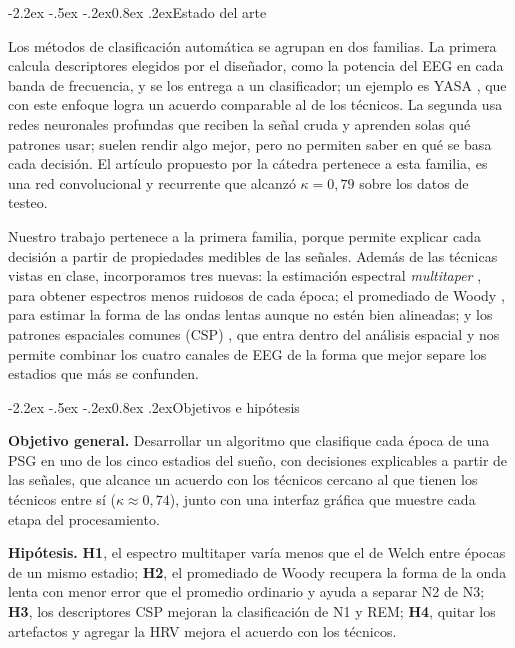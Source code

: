 \documentclass[11pt,a4paper]{article}
\makeatletter
\renewcommand\subsection{\@startsection{subsection}{2}{\z@}%
  {-2.2ex \@plus -.5ex \@minus -.2ex}{0.8ex \@plus .2ex}{\normalfont\normalsize\bfseries}}
\makeatother
\begin{document}
\subsection{Estado del arte}

Los métodos de clasificación automática se agrupan en dos familias. La
primera calcula descriptores elegidos por el diseñador, como la potencia
del EEG en cada banda de frecuencia, y se los entrega a un
clasificador; un ejemplo es YASA \cite{yasa}, que con este enfoque logra
un acuerdo comparable al de los técnicos. La segunda usa redes
neuronales profundas que reciben la señal cruda y aprenden solas qué
patrones usar; suelen rendir algo mejor, pero no permiten saber en qué
se basa cada decisión. El artículo propuesto por la cátedra
\cite{alvarez} pertenece a esta familia, es una red convolucional y
recurrente que alcanzó $\kappa = 0{,}79$ sobre los datos de testeo.

Nuestro trabajo pertenece a la primera familia, porque permite explicar
cada decisión a partir de propiedades medibles de las señales. Además de
las técnicas vistas en clase, incorporamos tres nuevas: la estimación espectral
\emph{multitaper} \cite{thomson,prerau}, para obtener espectros menos
ruidosos de cada época; el promediado de Woody \cite{woody}, para
estimar la forma de las ondas lentas aunque no estén bien alineadas; y
los patrones espaciales comunes (CSP) \cite{ramoser}, que entra dentro del análisis
espacial y nos permite combinar los cuatro canales de EEG de la forma que mejor separe los estadios que más
se confunden.

\subsection{Objetivos e hipótesis}

\textbf{Objetivo general.} Desarrollar un algoritmo que clasifique cada
época de una PSG en uno de los cinco estadios del sueño, con decisiones
explicables a partir de las señales, que alcance un acuerdo con
los técnicos cercano al que tienen los técnicos entre sí
($\kappa \approx 0{,}74$), junto con una interfaz gráfica que muestre
cada etapa del procesamiento.

\textbf{Hipótesis.} \textbf{H1}, el espectro multitaper varía menos que el de
Welch entre épocas de un mismo estadio; \textbf{H2}, el promediado de
Woody recupera la forma de la onda lenta con menor error que el promedio
ordinario y ayuda a separar N2 de N3; \textbf{H3}, los descriptores CSP
mejoran la clasificación de N1 y REM; \textbf{H4}, quitar los artefactos
y agregar la HRV mejora el acuerdo con los técnicos.
\end{document}
